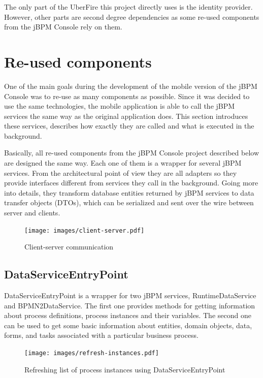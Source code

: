 \documentclass[12pt,oneside,final]{fithesis2}
\begin{document}
The only part of the UberFire this project directly uses is the identity provider.
However, other parts are second degree dependencies as some re-used components from the jBPM Console rely on them.

\section{Re-used components}
One of the main goals during the development of the mobile version of the jBPM Console was to re-use as many components as possible.
Since it was decided to use the same technologies, the mobile application is able to call the jBPM services the same way as the original application does.
This section introduces these services, describes how exactly they are called and what is executed in the background.

Basically, all re-used components from the jBPM Console project described below are designed the same way.
Each one of them is a wrapper for several jBPM services.
From the architectural point of view they are all adapters so they provide interfaces different from services they call in the background.
Going more into details, they transform database entities returned by jBPM services to data transfer objects (DTOs), which can be serialized and sent over the wire between server and clients.

\begin{figure}[ht!]
\centering
\texttt{[image: images/client-server.pdf]}
\caption{Client-server communication}
\label{fig:client-server}
\end{figure}

\label{sec:reused-components}
\subsection{DataServiceEntryPoint}

DataServiceEntryPoint is a wrapper for two jBPM services, RuntimeDataService and BPMN2DataService.
The first one provides methods for getting information about process definitions, process instances and their variables.
The second one can be used to get some basic information about entities, domain objects, data, forms, and tasks associated with a particular business process.

\begin{figure}[ht!]
\centering
\texttt{[image: images/refresh-instances.pdf]}
\caption{Refreshing list of process instances using DataServiceEntryPoint}
\label{fig:refresh-instances}
\end{figure}
\end{document}
